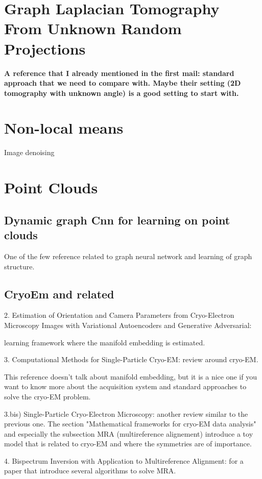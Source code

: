 \section{Graph Laplacian Tomography From Unknown Random Projections}
\textbf{A reference that I already mentioned in the first mail:
standard approach that we need to compare with. 
Maybe their setting (2D tomography with unknown angle) is a good setting to start with.
}

\section{Non-local means}
Image denoising


\section{Point Clouds}
\subsection{Dynamic graph Cnn for learning on point clouds}
One of the few reference related to graph neural network and learning of graph structure. 


\subsection{CryoEm and related}
2. Estimation of Orientation and Camera Parameters from Cryo-Electron Microscopy Images with Variational Autoencoders and Generative Adversarial: 

learning framework where the manifold embedding is estimated.

3. Computational Methods for Single-Particle Cryo-EM: 
review around cryo-EM. 

This reference doesn't talk about manifold embedding, but it is a nice one if you want to know more about 
the acquisition system and standard approaches to solve the cryo-EM problem.


3.bis) Single-Particle Cryo-Electron Microscopy: 
another review similar to the previous one. The section "Mathematical frameworks for cryo-EM data analysis" 
and especially the subsection MRA (multireference alignement) introduce 
a toy model that is related to cryo-EM and where the symmetries are of importance. 

4. Bispectrum Inversion with Application to Multireference Alignment: 
for a paper that introduce several algorithms to solve MRA.